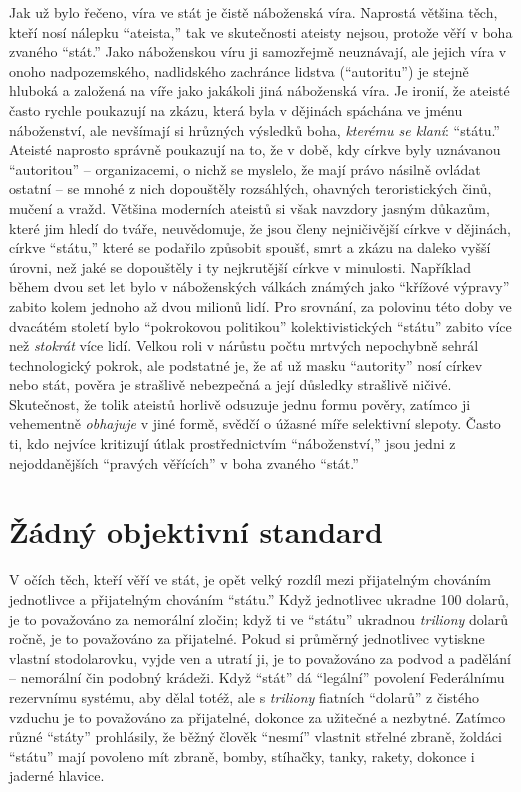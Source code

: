 \documentclass{book}
\begin{document}
Jak už bylo řečeno, víra ve stát je čistě náboženská víra. Naprostá většina těch, kteří nosí nálepku \enquote{ateista,} tak ve skutečnosti ateisty nejsou, protože věří v boha zvaného \enquote{stát.} Jako náboženskou víru ji samozřejmě neuznávají, ale jejich víra v onoho nadpozemského, nadlidského zachránce lidstva (\enquote{autoritu}) je stejně hluboká a založená na víře jako jakákoli jiná náboženská víra. Je ironií, že ateisté často rychle poukazují na zkázu, která byla v dějinách spáchána ve jménu náboženství, ale nevšímají si hrůzných výsledků boha, \emph{kterému se klaní}: \enquote{státu.} Ateisté naprosto správně poukazují na to, že v době, kdy církve byly uznávanou \enquote{autoritou} -- organizacemi, o nichž se myslelo, že mají právo násilně ovládat ostatní -- se mnohé z nich dopouštěly rozsáhlých, ohavných teroristických činů, mučení a vražd. Většina moderních ateistů si však navzdory jasným důkazům, které jim hledí do tváře, neuvědomuje, že jsou členy nejničivější církve v dějinách, církve \enquote{státu,} které se podařilo způsobit spoušť, smrt a zkázu na daleko vyšší úrovni, než jaké se dopouštěly i ty nejkrutější církve v minulosti. Například během dvou set let bylo v náboženských válkách známých jako \enquote{křížové výpravy} zabito kolem jednoho až dvou milionů lidí. Pro srovnání, za polovinu této doby ve dvacátém století bylo \enquote{pokrokovou politikou} kolektivistických \enquote{státu} zabito více než \emph{stokrát} více lidí. Velkou roli v nárůstu počtu mrtvých nepochybně sehrál technologický pokrok, ale podstatné je, že ať už masku \enquote{autority} nosí církev nebo stát, pověra je strašlivě nebezpečná a její důsledky strašlivě ničivé. Skutečnost, že tolik ateistů horlivě odsuzuje jednu formu pověry, zatímco ji vehementně \emph{obhajuje} v jiné formě, svědčí o úžasné míře selektivní slepoty. Často ti, kdo nejvíce kritizují útlak prostřednictvím \enquote{náboženství,} jsou jedni z nejoddanějších \enquote{pravých věřících} v boha zvaného \enquote{stát.}

\section{Žádný objektivní standard}

V očích těch, kteří věří ve stát, je opět velký rozdíl mezi přijatelným chováním jednotlivce a přijatelným chováním \enquote{státu.} Když jednotlivec ukradne 100 dolarů, je to považováno za nemorální zločin; když ti ve \enquote{státu} ukradnou \emph{triliony} dolarů ročně, je to považováno za přijatelné. Pokud si průměrný jednotlivec vytiskne vlastní stodolarovku, vyjde ven a utratí ji, je to považováno za podvod a padělání -- nemorální čin podobný krádeži. Když \enquote{stát} dá \enquote{legální} povolení Federálnímu rezervnímu systému, aby dělal totéž, ale s \emph{triliony} fiatních \enquote{dolarů} z čistého vzduchu je to považováno za přijatelné, dokonce za užitečné a nezbytné. Zatímco různé \enquote{státy} prohlásily, že běžný člověk \enquote{nesmí} vlastnit střelné zbraně, žoldáci \enquote{státu} mají povoleno mít zbraně, bomby, stíhačky, tanky, rakety, dokonce i jaderné hlavice.
\end{document}
